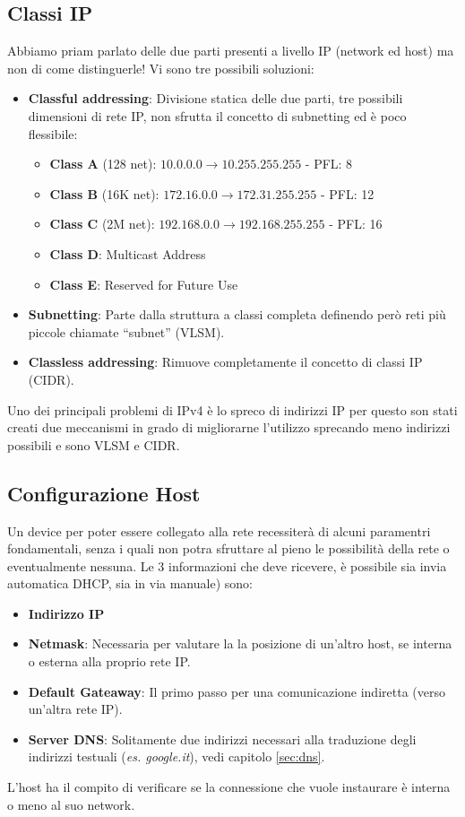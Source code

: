 \documentclass[12pt]{article}
\begin{document}
\subsection{Classi IP} \label{subsec:ipclass} %
Abbiamo priam parlato delle due parti presenti a livello IP (network ed host) ma non di come distinguerle! Vi sono tre possibili soluzioni:
\begin{itemize}
  \item \textbf{Classful addressing}: Divisione statica delle due parti, tre possibili dimensioni di rete IP, non sfrutta il concetto di subnetting ed è poco flessibile:
  \begin{itemize}
    \item \textbf{Class A} (128 net): $10.0.0.0\rightarrow10.255.255.255$ - PFL: 8
    \item \textbf{Class B} (16K net): $172.16.0.0\rightarrow172.31.255.255$ - PFL: 12
    \item \textbf{Class C} (2M net): $192.168.0.0\rightarrow192.168.255.255$ - PFL: 16
    \item \textbf{Class D}: Multicast Address
    \item \textbf{Class E}: Reserved for Future Use
  \end{itemize}
  \item \textbf{Subnetting}: Parte dalla struttura a classi completa definendo però reti più piccole chiamate ``subnet'' (VLSM).
  \item \textbf{Classless addressing}: Rimuove completamente il concetto di classi IP (CIDR).
\end{itemize}
Uno dei principali problemi di IPv4 è lo spreco di indirizzi IP per questo son stati creati due meccanismi in grado di migliorarne l'utilizzo sprecando meno indirizzi possibili e sono VLSM e CIDR.

\subsection{Configurazione Host} \label{subsec:hostconfig} %
Un device per poter essere collegato alla rete recessiterà di alcuni paramentri fondamentali, senza i quali non potra sfruttare al pieno le possibilità della rete o eventualmente nessuna. Le 3 informazioni che deve ricevere, è possibile sia invia automatica DHCP, sia in via manuale) sono:
\begin{itemize}
  \item \textbf{Indirizzo IP}
  \item \textbf{Netmask}: Necessaria per valutare la la posizione di un'altro host, se interna o esterna alla proprio rete IP.
  \item \textbf{Default Gateaway}: Il primo passo per una comunicazione indiretta (verso un'altra rete IP).
  \item \textbf{Server DNS}: Solitamente due indirizzi necessari alla traduzione degli indirizzi testuali (\textit{es. google.it}), vedi capitolo \ref{sec:dns}.
\end{itemize}
L'host ha il compito di verificare se la connessione che vuole instaurare è interna o meno al suo network.
\end{document}
